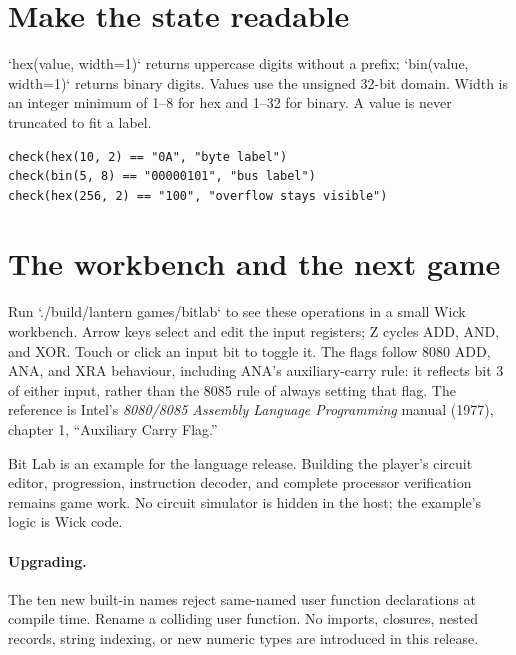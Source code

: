 \section{Make the state readable}

`hex(value, width=1)` returns uppercase digits without a prefix;
`bin(value, width=1)` returns binary digits. Values use the unsigned 32-bit
domain. Width is an integer minimum of 1--8 for hex and 1--32 for binary.
A value is never truncated to fit a label.

\begin{lstlisting}[language=wick]
check(hex(10, 2) == "0A", "byte label")
check(bin(5, 8) == "00000101", "bus label")
check(hex(256, 2) == "100", "overflow stays visible")
\end{lstlisting}

\section{The workbench and the next game}

Run `./build/lantern games/bitlab` to see these operations in a small Wick
workbench. Arrow keys select and edit the input registers; Z cycles ADD,
AND, and XOR. Touch or click an input bit to toggle it. The flags follow
8080 ADD, ANA, and XRA behaviour, including ANA's auxiliary-carry rule:
it reflects bit 3 of either input, rather than the 8085 rule of always
setting that flag. The reference is Intel's \emph{8080/8085 Assembly Language
Programming} manual (1977), chapter 1, ``Auxiliary Carry Flag.''

Bit Lab is an example for the language release. Building the player's
circuit editor, progression, instruction decoder, and complete processor
verification remains game work. No circuit simulator is hidden in the host;
the example's logic is Wick code.

\paragraph{Upgrading.} The ten new built-in names reject same-named user function declarations at compile time. Rename a
colliding user function. No imports, closures, nested records, string indexing, or new
numeric types are introduced in this release.
